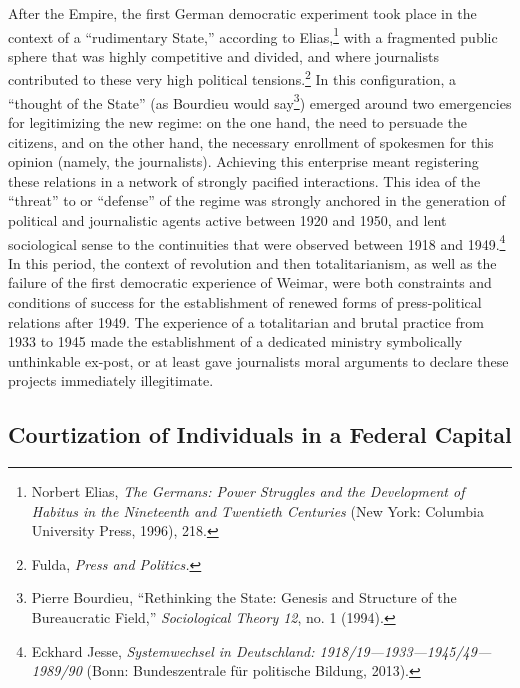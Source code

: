 \documentclass{tufte-handout}
\begin{document}
After the Empire, the first German democratic experiment took place in
the context of a ``rudimentary State,'' according to Elias,\footnote{Norbert
  Elias, \emph{The Germans: Power Struggles and the Development of
  Habitus in the Nineteenth and Twentieth Centuries} (New York: Columbia
  University Press, 1996), 218.} with a fragmented public sphere that
was highly competitive and divided, and where journalists contributed to
these very high political tensions.\footnote{Fulda, \emph{Press and
  Politics.}} In this configuration, a ``thought of the State'' (as
Bourdieu would say\footnote{Pierre Bourdieu, ``Rethinking the State:
  Genesis and Structure of the Bureaucratic Field,'' \emph{Sociological
  Theory 12}, no. 1 (1994).}) emerged around two emergencies for
legitimizing the new regime: on the one hand, the need to persuade the
citizens, and on the other hand, the necessary enrollment of spokesmen
for this opinion (namely, the journalists). Achieving this enterprise
meant registering these relations in a network of strongly pacified
interactions. This idea of the ``threat'' to or ``defense'' of the
regime was strongly anchored in the generation of political and
journalistic agents active between 1920 and 1950, and lent sociological
sense to the continuities that were observed between 1918 and
1949.\footnote{Eckhard Jesse, \emph{Systemwechsel in Deutschland:
  1918/19---1933---1945/49---1989/90} (Bonn: Bundeszentrale für
  politische Bildung, 2013).} In this period, the context of revolution
and then totalitarianism, as well as the failure of the first democratic
experience of Weimar, were both constraints and conditions of success
for the establishment of renewed forms of press-political relations
after 1949. The experience of a totalitarian and brutal practice from
1933 to 1945 made the establishment of a dedicated ministry symbolically
unthinkable ex-post, or at least gave journalists moral arguments to
declare these projects immediately illegitimate.

\hypertarget{courtization-of-individuals-in-a-federal-capital}{%
\subsection{Courtization of Individuals in a
Federal
Capital}\label{courtization-of-individuals-in-a-federal-capital}}
\end{document}
